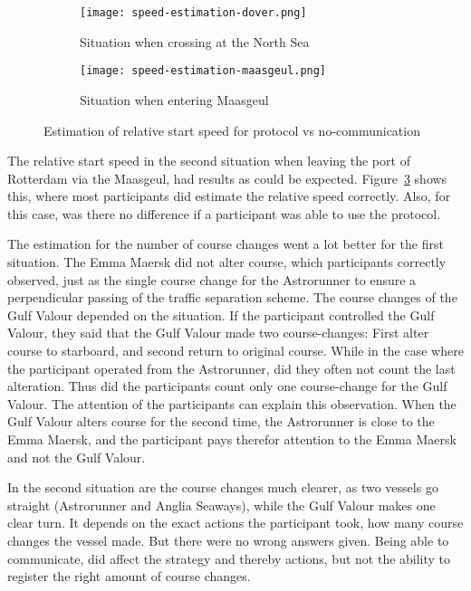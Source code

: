\begin{figure}[hbtp]
	\centering
	\begin{subfigure}[b]{0.75\textwidth}
		\texttt{[image: speed-estimation-dover.png]}
		\caption{Situation when crossing at the North Sea}
		\label{fig:speed-estimation-dover}
	\end{subfigure}
	
	\begin{subfigure}[b]{0.75\textwidth}
		\centering
		\texttt{[image: speed-estimation-maasgeul.png]}
		\caption{Situation when entering Maasgeul}
		\label{fig:speed-estimation-maasgeul}
	\end{subfigure}
	
	\caption{Estimation of relative start speed for protocol vs no-communication}
\end{figure}

The relative start speed in the second situation when leaving the port of Rotterdam via the Maasgeul, had results as could be expected. Figure~\ref{fig:speed-estimation-maasgeul} shows this, where most participants did estimate the relative speed correctly. Also, for this case, was there no difference if a participant was able to use the protocol.

The estimation for the number of course changes went a lot better for the first situation. The Emma Maersk did not alter course, which participants correctly observed, just as the single course change for the Astrorunner to ensure a perpendicular passing of the traffic separation scheme. The course changes of the Gulf Valour depended on the situation. If the participant controlled the Gulf Valour, they said that the Gulf Valour made two course-changes: First alter course to starboard, and second return to original course. While in the case where the participant operated from the Astrorunner, did they often not count the last alteration. Thus did the participants count only one course-change for the Gulf Valour. The attention of the participants can explain this observation. When the Gulf Valour alters course for the second time, the Astrorunner is close to the Emma Maersk, and the participant pays therefor attention to the Emma Maersk and not the Gulf Valour.

In the second situation are the course changes much clearer, as two vessels go straight (Astrorunner and Anglia Seaways), while the Gulf Valour makes one clear turn. It depends on the exact actions the participant took, how many course changes the vessel made. But there were no wrong answers given. 
Being able to communicate, did affect the strategy and thereby actions, but not the ability to register the right amount of course changes.

